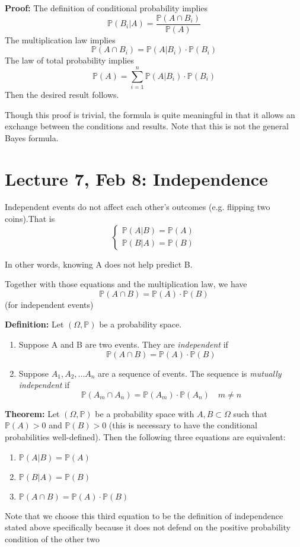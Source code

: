 \documentclass[12pt]{article}
\renewcommand{\P}{\mathbb{P}}
\begin{document}
\textbf{Proof:} 
The definition of conditional probability implies 
\[\P(B_i | A) = \frac{\P(A \cap B_i)}{\P(A)}\]
The multiplication law implies 
\[\P(A \cap B_i) = \P(A | B_i) \cdot \P(B_i)\]
The law of total probability implies 
\[\P(A) = \sum_{i=1}^n \P(A | B_i) \cdot \P(B_i)\]
Then the desired result follows. 

Though this proof is trivial, the formula is quite meaningful in that it allows an exchange between the conditions and results. Note that this is not the general Bayes formula. 

\section{Lecture 7, Feb 8: Independence}
Independent events do not affect each other's outcomes (e.g. flipping two coins).That is 
\[\begin{cases}
    \P(A | B) = \P(A)\\
    \P(B | A) = \P(B)
\end{cases}\]

In other words, knowing A does not help predict B.

Together with those equations and the multiplication law, we have 
\[\P(A \cap B) = \P(A) \cdot \P(B)\]
(for independent events)

\textbf{Definition:}
Let $(\Omega, \P)$ be a probability space. 
\begin{enumerate}
    \item Suppose A and B are two events. They are \emph{independent} if \[\P(A \cap B) = \P(A) \cdot \P(B)\]
    \item Suppose $A_1, A_2, ... A_n$ are a sequence of events. The sequence is \emph{mutually independent} if 
    \[\P(A_m \cap A_n) = \P(A_m) \cdot \P(A_n) \quad m \neq n\]
\end{enumerate}

\textbf{Theorem:} Let $(\Omega, \P)$ be a probability space with $A, B \subset \Omega$ such that $\P(A) > 0$ and $\P(B) > 0$ (this is necessary to have the conditional probabilities well-defined). Then the following three equations are equivalent:
\begin{enumerate}
    \item $\P(A | B) = \P(A)$
    \item $\P(B | A) = \P(B)$
    \item $\P(A \cap B) = \P(A) \cdot \P(B)$
\end{enumerate}
Note that we choose this third equation to be the definition of independence stated above specifically because it does not defend on the positive probability condition of the other two
\end{document}
